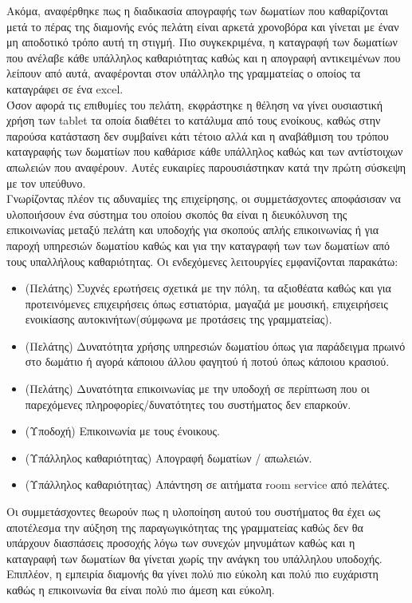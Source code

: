 \noindent
Ακόμα, αναφέρθηκε πως η διαδικασία απογραφής των δωματίων που καθαρίζονται μετά το πέρας της διαμονής ενός πελάτη είναι αρκετά χρονοβόρα και γίνεται με έναν μη αποδοτικό τρόπο αυτή τη στιγμή. Πιο συγκεκριμένα, η καταγραφή των δωματίων που ανέλαβε κάθε υπάλληλος καθαριότητας καθώς και η απογραφή  αντικειμένων που λείπουν από αυτά, αναφέρονται στον υπάλληλο της γραμματείας ο οποίος τα καταγράφει σε ένα excel.\\

\noindent
Όσον αφορά τις επιθυμίες του πελάτη, εκφράστηκε η θέληση να γίνει ουσιαστική χρήση των tablet τα οποία διαθέτει το κατάλυμα από τους ενοίκους, καθώς στην παρούσα κατάσταση δεν συμβαίνει κάτι τέτοιο αλλά και η αναβάθμιση του τρόπου καταγραφής των δωματίων που καθάρισε κάθε υπάλληλος καθώς και των αντίστοιχων απωλειών που αναφέρουν. Αυτές ευκαιρίες παρουσιάστηκαν κατά την πρώτη σύσκεψη με τον υπεύθυνο.\\

\noindent
Γνωρίζοντας πλέον τις αδυναμίες της επιχείρησης, οι συμμετάσχοντες αποφάσισαν να υλοποιήσουν ένα σύστημα του οποίου σκοπός θα  είναι η διευκόλυνση της επικοινωνίας μεταξύ πελάτη και υποδοχής για σκοπούς απλής επικοινωνίας ή για παροχή υπηρεσιών δωματίου καθώς και για την καταγραφή των των δωματίων από τους υπαλλήλους καθαριότητας. Οι ενδεχόμενες λειτουργίες εμφανίζονται παρακάτω:\\  

\begin{itemize}
	\item (Πελάτης) Συχνές ερωτήσεις σχετικά με την πόλη, τα αξιοθέατα καθώς και για προτεινόμενες επιχειρήσεις όπως εστιατόρια, μαγαζιά με μουσική, επιχειρήσεις ενοικίασης αυτοκινήτων(σύμφωνα με προτάσεις της γραμματείας).
	\item (Πελάτης) Δυνατότητα χρήσης υπηρεσιών δωματίου όπως για παράδειγμα πρωινό στο δωμάτιο ή αγορά κάποιου άλλου φαγητού ή ποτού όπως κάποιου κρασιού.
	\item (Πελάτης) Δυνατότητα επικοινωνίας με την υποδοχή σε περίπτωση που οι παρεχόμενες πληροφορίες/δυνατότητες του συστήματος δεν επαρκούν.
	\item (Υποδοχή) Επικοινωνία με τους ένοικους. 
	\item (Υπάλληλος καθαριότητας) Απογραφή δωματίων / απωλειών. 
	\item (Υπάλληλος καθαριότητας) Απάντηση σε αιτήματα room service από πελάτες.
\end{itemize} 

\noindent
Οι συμμετάσχοντες θεωρούν πως η υλοποίηση αυτού του συστήματος θα έχει ως αποτέλεσμα την αύξηση της παραγωγικότητας της γραμματείας καθώς δεν θα υπάρχουν διασπάσεις προσοχής λόγω των συνεχών μηνυμάτων καθώς και η καταγραφή των δωματίων θα γίνεται χωρίς την ανάγκη του υπάλληλου υποδοχής. Επιπλέον, η εμπειρία διαμονής θα γίνει πολύ πιο εύκολη και πολύ πιο ευχάριστη καθώς η επικοινωνία θα είναι πολύ πιο άμεση και εύκολη.\\ 

